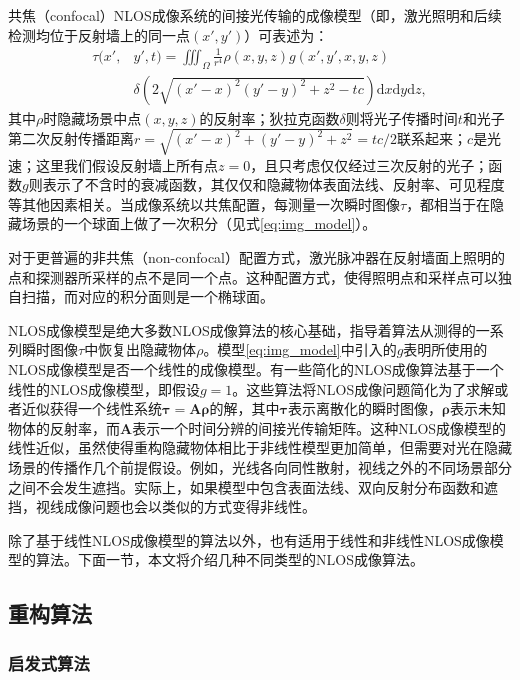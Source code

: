 \documentclass[master]{shtthesis}             %
\begin{document}
共焦（confocal）NLOS成像系统的间接光传输的成像模型（即，激光照明和后续检测均位于反射墙上的同一点$(x',y')$）可表述为：
\begin{equation}\label{eq:img_model}
  \begin{split}
    \tau(x',&y',t)=\iiint_\Omega \frac{1}{r^4}\rho(x,y,z)g(x',y',x,y,z)\\ &\delta\left(2\sqrt{(x'-x)^2(y'-y)^2+z^2-tc}\right)\text{d}x\text{d}y\text{d}z,
  \end{split}
\end{equation}
其中$\rho$时隐藏场景中点$(x,y,z)$的反射率；狄拉克函数$\delta$则将光子传播时间$t$和光子第二次反射传播距离$r=\sqrt{(x'-x)^2+(y'-y)^2+z^2}=tc/2$联系起来；$c$是光速；这里我们假设反射墙上所有点$z=0$，且只考虑仅仅经过三次反射的光子；函数$g$则表示了不含时的衰减函数，其仅仅和隐藏物体表面法线、反射率、可见程度等其他因素相关。当成像系统以共焦配置，每测量一次瞬时图像$\tau$，都相当于在隐藏场景的一个球面上做了一次积分（见式\ref{eq:img_model}）。

对于更普遍的非共焦（non-confocal）配置方式，激光脉冲器在反射墙面上照明的点和探测器所采样的点不是同一个点。这种配置方式，使得照明点和采样点可以独自扫描，而对应的积分面则是一个椭球面。

NLOS成像模型是绝大多数NLOS成像算法的核心基础，指导着算法从测得的一系列瞬时图像$\tau$中恢复出隐藏物体$\rho$。模型\ref{eq:img_model}中引入的$g$表明所使用的NLOS成像模型是否一个线性的成像模型。有一些简化的NLOS成像算法基于一个线性的NLOS成像模型，即假设$g=1$。这些算法将NLOS成像问题简化为了求解或者近似获得一个线性系统$\mathbf{\tau=A\rho}$的解，其中$\mathbf{\tau}$表示离散化的瞬时图像，$\mathbf{\rho}$表示未知物体的反射率，而$\mathbf{A}$表示一个时间分辨的间接光传输矩阵。这种NLOS成像模型的线性近似，虽然使得重构隐藏物体相比于非线性模型更加简单，但需要对光在隐藏场景的传播作几个前提假设。例如，光线各向同性散射，视线之外的不同场景部分之间不会发生遮挡。实际上，如果模型中包含表面法线、双向反射分布函数和遮挡，视线成像问题也会以类似的方式变得非线性。

除了基于线性NLOS成像模型的算法以外，也有适用于线性和非线性NLOS成像模型的算法。下面一节，本文将介绍几种不同类型的NLOS成像算法。

\subsection{重构算法}

\subsubsection{启发式算法}
\end{document}
